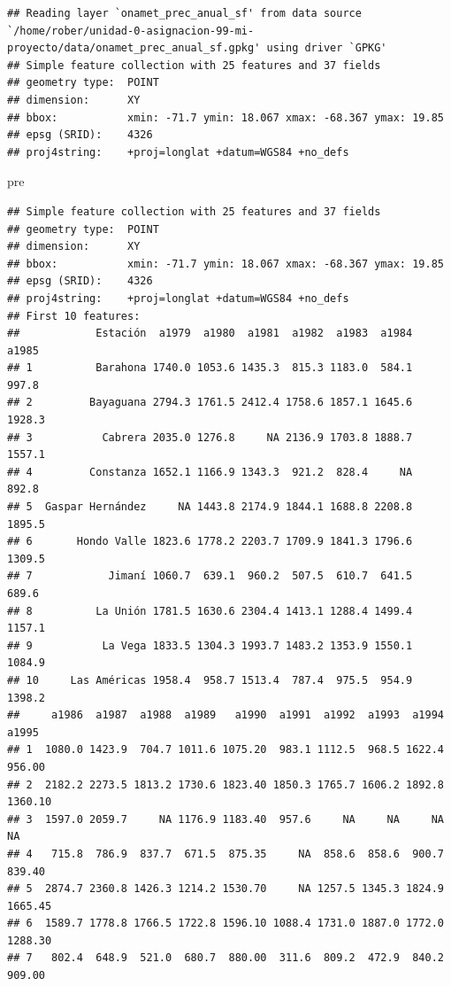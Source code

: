 \documentclass[11pt,]{article}
\newenvironment{Shaded}{\begin{snugshade}}{\end{snugshade}}
\newcommand{\NormalTok}[1]{#1}
\begin{document}
\begin{verbatim}
## Reading layer `onamet_prec_anual_sf' from data source `/home/rober/unidad-0-asignacion-99-mi-proyecto/data/onamet_prec_anual_sf.gpkg' using driver `GPKG'
## Simple feature collection with 25 features and 37 fields
## geometry type:  POINT
## dimension:      XY
## bbox:           xmin: -71.7 ymin: 18.067 xmax: -68.367 ymax: 19.85
## epsg (SRID):    4326
## proj4string:    +proj=longlat +datum=WGS84 +no_defs
\end{verbatim}

\begin{Shaded}
\begin{Highlighting}[]
\NormalTok{pre}
\end{Highlighting}
\end{Shaded}

\begin{verbatim}
## Simple feature collection with 25 features and 37 fields
## geometry type:  POINT
## dimension:      XY
## bbox:           xmin: -71.7 ymin: 18.067 xmax: -68.367 ymax: 19.85
## epsg (SRID):    4326
## proj4string:    +proj=longlat +datum=WGS84 +no_defs
## First 10 features:
##            Estación  a1979  a1980  a1981  a1982  a1983  a1984  a1985
## 1          Barahona 1740.0 1053.6 1435.3  815.3 1183.0  584.1  997.8
## 2         Bayaguana 2794.3 1761.5 2412.4 1758.6 1857.1 1645.6 1928.3
## 3           Cabrera 2035.0 1276.8     NA 2136.9 1703.8 1888.7 1557.1
## 4         Constanza 1652.1 1166.9 1343.3  921.2  828.4     NA  892.8
## 5  Gaspar Hernández     NA 1443.8 2174.9 1844.1 1688.8 2208.8 1895.5
## 6       Hondo Valle 1823.6 1778.2 2203.7 1709.9 1841.3 1796.6 1309.5
## 7            Jimaní 1060.7  639.1  960.2  507.5  610.7  641.5  689.6
## 8          La Unión 1781.5 1630.6 2304.4 1413.1 1288.4 1499.4 1157.1
## 9           La Vega 1833.5 1304.3 1993.7 1483.2 1353.9 1550.1 1084.9
## 10     Las Américas 1958.4  958.7 1513.4  787.4  975.5  954.9 1398.2
##     a1986  a1987  a1988  a1989   a1990  a1991  a1992  a1993  a1994   a1995
## 1  1080.0 1423.9  704.7 1011.6 1075.20  983.1 1112.5  968.5 1622.4  956.00
## 2  2182.2 2273.5 1813.2 1730.6 1823.40 1850.3 1765.7 1606.2 1892.8 1360.10
## 3  1597.0 2059.7     NA 1176.9 1183.40  957.6     NA     NA     NA      NA
## 4   715.8  786.9  837.7  671.5  875.35     NA  858.6  858.6  900.7  839.40
## 5  2874.7 2360.8 1426.3 1214.2 1530.70     NA 1257.5 1345.3 1824.9 1665.45
## 6  1589.7 1778.8 1766.5 1722.8 1596.10 1088.4 1731.0 1887.0 1772.0 1288.30
## 7   802.4  648.9  521.0  680.7  880.00  311.6  809.2  472.9  840.2  909.00

\end{verbatim}
\end{document}
